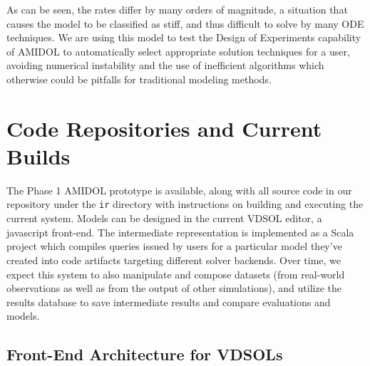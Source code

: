 \documentclass[11pt]{article}
\newcommand{\amidol}{\textsc{AMIDOL}}
\begin{document}
As can be seen, the rates differ by many orders of magnitude, a situation that causes the model to be classified as stiff, and thus difficult to solve by many ODE techniques.  We are using this model to test the Design of Experiments capability of \amidol{} to automatically select appropriate solution techniques for a user, avoiding numerical instability and the use of inefficient algorithms which otherwise could be pitfalls for traditional modeling methods.

\section{Code Repositories and Current Builds}

The Phase 1 \amidol{} prototype is available, along with all source code in our repository under the \texttt{ir} directory with instructions on building and executing the current system.  Models can be designed in the current VDSOL editor, a javascript front-end.  The intermediate representation is implemented as a Scala project which compiles queries issued by users for a particular model they've created into code artifacts targeting different solver backends. Over time, we expect this system to also manipulate and compose datasets (from real-world observations as well as from the output of other simulations), and utilize the results database to save intermediate results and compare evaluations and models.


\subsection{Front-End Architecture for VDSOLs}
\end{document}
